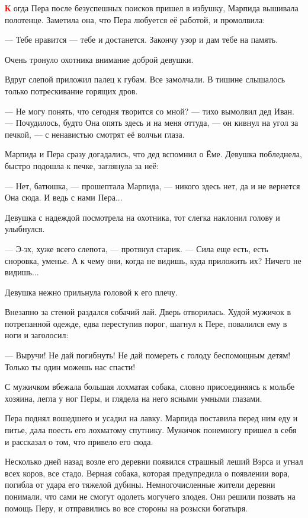 \documentclass[oneside,final,14pt]{extreport}
\begin{document}
	\lettrine[findent=0pt]{\textbf{\textcolor{red}{К}}}{} огда Пера после безуспешных поисков пришел в избушку, Марпида вышивала полотенце. Заметила она, что Пера любуется её работой, и промолвила:
	
	— Тебе нравится — тебе и достанется. Закончу узор и дам тебе на память.
	
	Очень тронуло охотника внимание доброй девушки.
	
	Вдруг слепой приложил палец к губам. Все замолчали. В тишине слышалось только потрескивание горящих дров.
	
	— Не могу понять, что сегодня творится со мной? — тихо вымолвил дед Иван. — Почудилось, будто Она опять здесь и на меня оттуда, — он кивнул на угол за печкой, — с ненавистью смотрят её волчьи глаза.
	
	Марпида и Пера сразу догадались, что дед вспомнил о Ёме. Девушка побледнела, быстро подошла к печке, заглянула за неё:
	
	— Нет, батюшка, — прошептала Марпида, — никого здесь нет, да и не вернется Она сюда. И ведь с нами Пера...
	
	Девушка с надеждой посмотрела на охотника, тот слегка наклонил голову и улыбнулся.
	
	— Э-эх, хуже всего слепота, — протянул старик. — Сила еще есть, есть сноровка, уменье. А к чему они, когда не видишь, куда приложить их? Ничего не видишь...
	
	Девушка нежно прильнула головой к его плечу.
	
	Внезапно за стеной раздался собачий лай. Дверь отворилась. Худой мужичок в потрепанной одежде, едва переступив порог, шагнул к Пере, повалился ему в ноги и заголосил:
	
	— Выручи! Не дай погибнуть! Не дай помереть с голоду беспомощным детям! Только ты один можешь нас спасти!
	
	С мужичком вбежала большая лохматая собака, словно присоединяясь к мольбе хозяина, легла у ног Перы, и глядела на него ясными умными глазами.
	
	Пера поднял вошедшего и усадил на лавку. Марпида поставила перед ним еду и питье, дала поесть его лохматому спутнику. Мужичок понемногу пришел в себя и рассказал о том, что привело его сюда.
	
	Несколько дней назад возле его деревни появился страшный леший Вэрса и угнал всех коров, все стадо. Верная собака, которая предупредила о появлении вора, погибла от удара его тяжелой дубины. Немногочисленные жители деревни понимали, что сами не смогут одолеть могучего злодея. Они решили позвать на помощь Перу, и отправились во все стороны на розыски богатыря.
	
\end{document}

